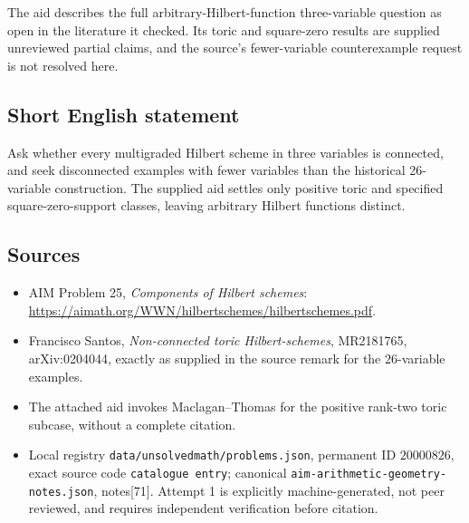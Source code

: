 \documentclass[11pt]{article}
\begin{document}
The aid describes the full arbitrary-Hilbert-function three-variable question as open in the literature it checked. Its toric and square-zero results are supplied unreviewed partial claims, and the source's fewer-variable counterexample request is not resolved here.
\subsection{Short English statement}
Ask whether every multigraded Hilbert scheme in three variables is connected, and seek disconnected examples with fewer variables than the historical 26-variable construction. The supplied aid settles only positive toric and specified square-zero-support classes, leaving arbitrary Hilbert functions distinct.
\subsection{Sources}
\begin{itemize}
\item AIM Problem 25, \emph{Components of Hilbert schemes}: \url{https://aimath.org/WWN/hilbertschemes/hilbertschemes.pdf}.
\item Francisco Santos, \emph{Non-connected toric Hilbert-schemes}, MR2181765, arXiv:0204044, exactly as supplied in the source remark for the \(26\)-variable examples.
\item The attached aid invokes Maclagan--Thomas for the positive rank-two toric subcase, without a complete citation.
\item Local registry \texttt{data/unsolvedmath/problems.json}, permanent ID \(20000826\), exact source code \texttt{catalogue entry}; canonical \texttt{aim-arithmetic-geometry-notes.json}, notes[71]. Attempt 1 is explicitly machine-generated, not peer reviewed, and requires independent verification before citation.
\end{itemize}
\end{document}
